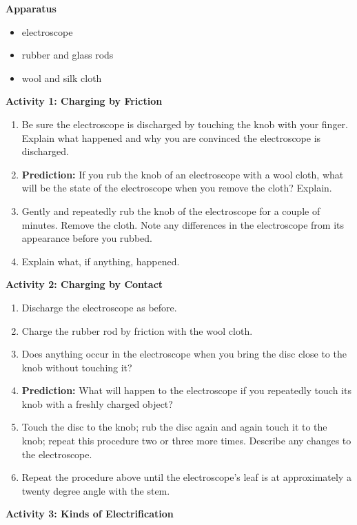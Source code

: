 \textbf{Apparatus}

\begin{itemize}
\item electroscope
\item rubber and glass rods
\item wool and silk cloth
\end{itemize}
\textbf{Activity 1: Charging by Friction}

\begin{enumerate}
\item Be sure the electroscope is discharged by touching the knob with your
finger. Explain what happened and why you are convinced the electroscope
is discharged.\vspace{15mm}

\item \textbf{Prediction:} If you rub the knob of an electroscope with a
wool cloth, what will be the state of the electroscope when you remove
the cloth? Explain.\vspace{15mm}

\item Gently and repeatedly rub the knob of the electroscope for a couple
of minutes. Remove the cloth. Note any differences in the electroscope
from its appearance before you rubbed.\vspace{15mm}

\item Explain what, if anything, happened.\vspace{15mm}

\end{enumerate}
\textbf{Activity 2: Charging by Contact}

\begin{enumerate}
\item Discharge the electroscope as before.
\item Charge the rubber rod by friction with
the wool cloth.
\item Does anything occur in the electroscope when you bring the disc close
to the knob without touching it?\vspace{15mm}

\item \textbf{Prediction:} What will happen to the electroscope if you repeatedly
touch its knob with a freshly charged object?\vspace{15mm}

\item Touch the disc to the knob; rub the disc again and again touch it
to the knob; repeat this procedure two or three more times. Describe
any changes to the electroscope.\vspace{15mm}

\item Repeat the procedure above until the electroscope's leaf is at approximately
a twenty degree angle with the stem.
\end{enumerate}
\textbf{Activity 3: Kinds of Electrification}

